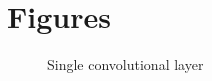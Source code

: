 \chapter{Figures}

\vspace*{-3in}

\begin{figure}
\vspace{2.4in}
\caption{Single convolutional layer}
\label{fig:NLSE_NN_Structure}
\end{figure}
\clearpage
\newpage






